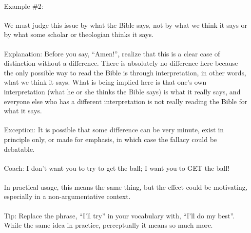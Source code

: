 \documentclass[a4paper,12pt,single,pdftex]{scrartcl}
\begin{document}
    
      
    \\

    
      Example \#2:
    \\

    
      
    \\

    
      We must judge this issue by what the Bible says, not by what we think it says or by what some scholar or theologian thinks it says.
    \\

    
      
    \\

    
      Explanation: Before you say, “Amen!”, realize that this is a clear case of distinction without a difference.  There is absolutely no difference here because the only possible way to read the Bible is through interpretation, in other words, what we think it says.  What is being implied here is that one's own interpretation (what he or she thinks the Bible says) is what it really says, and everyone else who has a different interpretation is not really reading the Bible for what it says.
    \\

    
      
    \\

    
      Exception: It is possible that some difference can be very minute, exist in principle only, or made for emphasis, in which case the fallacy could be debatable.
    \\

    
      
    \\

    
      Coach:  I don’t want you to try to get the ball; I want you to GET the ball!
    \\

    
      
    \\

    
      In practical usage, this means the same thing, but the effect could be motivating, especially in a non-argumentative context.
    \\

    
      
    \\

    
      Tip: Replace the phrase, “I’ll try” in your vocabulary with, “I’ll do my best”.  While the same idea in practice, perceptually it means so much more.
    \\
\end{document}
